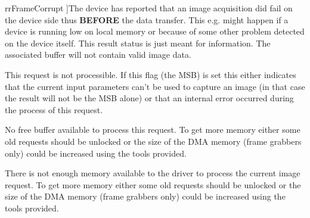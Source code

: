 \begin{Desc}
\begin{description}
{\hypertarget{group___common_interface_ggab6148762ea638f8eabbabfc9468b0d4ca0f3545d699e0f8ec3024afb3dafd7be0}{rr\+Frame\+Corrupt}\label{group___common_interface_ggab6148762ea638f8eabbabfc9468b0d4ca0f3545d699e0f8ec3024afb3dafd7be0}
}]The device has reported that an image acquisition did fail on the device side thus {\bfseries B\+E\+F\+O\+R\+E} the data transfer. This e.\+g. might happen if a device is running low on local memory or because of some other problem detected on the device itself. This result status is just meant for information. The associated buffer will not contain valid image data. \item[{\em 
\hypertarget{group___common_interface_ggab6148762ea638f8eabbabfc9468b0d4cad9d23726d801a3d57d8ccef35eb6957d}{rr\+Unprocessible\+Request}\label{group___common_interface_ggab6148762ea638f8eabbabfc9468b0d4cad9d23726d801a3d57d8ccef35eb6957d}
}]This request is not processible. If this flag (the M\+S\+B) is set this either indicates that the current input parameters can't be used to capture an image (in that case the result will not be the M\+S\+B alone) or that an internal error occurred during the process of this request. \item[{\em 
\hypertarget{group___common_interface_ggab6148762ea638f8eabbabfc9468b0d4cae85dafe5877ddacc11a0031babff1a96}{rr\+No\+Buffer\+Available}\label{group___common_interface_ggab6148762ea638f8eabbabfc9468b0d4cae85dafe5877ddacc11a0031babff1a96}
}]No free buffer available to process this request. To get more memory either some old requests should be unlocked or the size of the D\+M\+A memory (frame grabbers only) could be increased using the tools provided. \item[{\em 
\hypertarget{group___common_interface_ggab6148762ea638f8eabbabfc9468b0d4ca693b0a26ef8e2621e65764687fa764c8}{rr\+Not\+Enough\+Memory}\label{group___common_interface_ggab6148762ea638f8eabbabfc9468b0d4ca693b0a26ef8e2621e65764687fa764c8}
}]There is not enough memory available to the driver to process the current image request. To get more memory either some old requests should be unlocked or the size of the D\+M\+A memory (frame grabbers only) could be increased using the tools provided.


\end{description}
\end{Desc}
